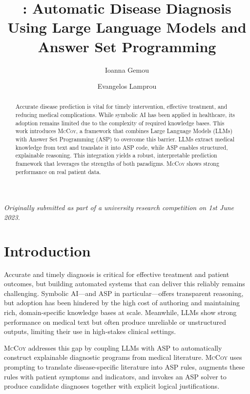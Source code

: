 \documentclass[11pt,leqno]{amsart}
\title[\sys: Automatic Disease Diagnosis Using LLMs \& ASP]{\sys: Automatic Disease Diagnosis Using Large Language Models and Answer Set Programming}
\author[Ioanna Gemou]{Ioanna Gemou}
\author[Evangelos Lamprou]{Evangelos Lamprou}
\newcommand{\sys}{\textsc{McCoy}\xspace}
\begin{document}
\maketitle
\vspace{-1.5em} %
{\small\itshape \centering Originally submitted as part of a university research competition on 1st June 2023.\par}
\vspace{0.5em} %

\begin{abstract}
Accurate disease prediction is vital for timely intervention, 
effective treatment, and reducing medical complications. 
While symbolic AI has been applied in healthcare, 
its adoption remains limited due to the complexity 
of required knowledge bases.
This work introduces \sys, a framework that combines Large Language Models (LLMs) 
with Answer Set Programming (ASP) to overcome this barrier. 
LLMs extract medical knowledge from text and translate it into ASP code, 
while ASP enables structured, explainable reasoning. 
This integration yields a robust, interpretable prediction framework 
that leverages the strengths of both paradigms. 
\sys shows strong performance on real patient data.
\end{abstract}

\section{Introduction}

Accurate and timely diagnosis is critical for effective treatment and patient outcomes, 
but building automated systems that can deliver this reliably remains challenging. 
Symbolic AI---and ASP in particular---offers transparent reasoning, 
but adoption has been hindered by the high cost of 
authoring and maintaining rich, domain-specific knowledge bases at scale. 
Meanwhile, LLMs show strong performance on medical text 
but often produce unreliable or unstructured outputs, limiting their use in 
high-stakes clinical settings.

\sys addresses this gap by coupling LLMs with ASP to automatically construct 
explainable diagnostic programs from medical literature. 
\sys uses prompting to translate disease-specific literature into ASP rules, 
augments these rules with patient symptoms and indicators, 
and invokes an ASP solver to produce candidate diagnoses together with explicit logical justifications.
\end{document}
